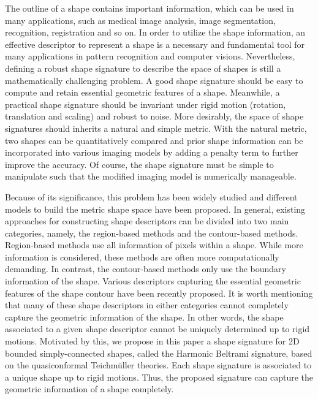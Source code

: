 \documentclass[review,onefignum,onetabnum]{siamonline190516}
\begin{document}

    The outline of a shape contains important information, which can be used in many applications, such as medical image analysis, image segmentation, recognition, registration and so on. In order to utilize the shape information, an effective descriptor to represent a shape is a necessary and fundamental tool for many applications in pattern recognition and computer visions. Nevertheless, defining a robust shape signature to describe the space of shapes is still a mathematically challenging problem. A good shape signature should be easy to compute and retain essential geometric features of a shape. Meanwhile, a practical shape signature should be invariant under rigid motion (rotation, translation and scaling) and robust to noise. More desirably, the space of shape signatures should inherits a natural and simple metric. With the natural metric, two shapes can be quantitatively compared and prior shape information can be incorporated into various imaging models by adding a penalty term to further improve the accuracy. Of course, the shape signature must be simple to manipulate such that the modified imaging model is numerically manageable.
    
    Because of its significance, this problem has been widely studied and different models to build the metric shape space have been proposed. In general, existing approaches for constructing shape descriptors can be divided into two main categories, namely, the region-based methods and the contour-based methods. Region-based methods use all information of pixels within a shape. While more information is considered, these methods are often more computationally demanding. In contrast, the contour-based methods only use the boundary information of the shape. Various descriptors capturing the essential geometric features of the shape contour have been recently proposed. It is worth mentioning that many of these shape descriptors in either categories cannot completely capture the geometric information of the shape. In other words, the shape associated to a given shape descriptor cannot be uniquely determined up to rigid motions. Motivated by this, we propose in this paper a shape signature for 2D bounded simply-connected shapes, called the Harmonic Beltrami signature, based on the quasiconformal Teichm\"uller theories. Each shape signature is associated to a unique shape up to rigid motions. Thus, the proposed signature can capture the geometric information of a shape completely.
    
\end{document}
